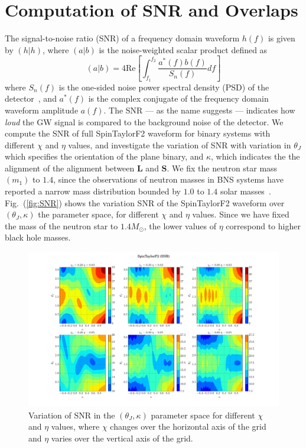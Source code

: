 \section{Computation of SNR and Overlaps}
The signal-to-noise ratio (SNR) of a frequency domain waveform $h(f)$ is given by 
$(h|h)$, where $(a|b)$ is the noise-weighted scalar product defined as 
\label{inner_product}  
\begin{equation} (a|b) = 4 \text{Re} \left[
\int_{f_{1}}^{f_{2}}  \dfrac{a^{*}(f)b(f)}{S_{n}(f)} df\right] 
\end{equation}
where $S_{n}(f)$ is the one-sided noise power spectral density (PSD) of the
detector~\cite{PSD}, and $a^{*}(f)$ is the complex conjugate of the frequency
domain waveform amplitude $a(f)$. The SNR --- as the name suggests --- indicates
how \textit{loud} the GW signal is compared to the background noise of the
detector. We compute the SNR of full SpinTaylorF2 waveform for binary systems
with  different $\chi$ and $\eta$ values, and investigate the variation of SNR
with variation in $\theta_{J}$ which specifies the orientation of the plane
binary, and $\kappa$, which indicates the the alignment of the alignment between
$\mathbf{L}$ and $\mathbf{S}$. We fix the neutron star mass $(m_{1})$ to $1.4$,
since the observations of neutron masses in BNS systems have reported a narrow
mass distribution bounded by $1.0$ to $1.4$ solar masses~\cite{Lorimer}.
Fig.~(\ref{fig:SNR}) shows the variation SNR of the SpinTaylorF2 waveform   over
$(\theta_J, \kappa)$ the parameter space, for different $\chi$ and $\eta$
values. Since we have fixed the mass of the neutron star to $1.4 M_{\odot}$, the
lower values of $\eta$ correspond to higher black hole masses.

\label{fig:SNR} 
\begin{figure}[t]
\includegraphics[width=\textwidth]{./images/SNR_GRID_0F.pdf}
\caption{Variation of SNR in the $(\theta_J, \kappa)$ parameter space for 
different $\chi$ and $\eta$ values, where $\chi$ changes over the horizontal 
axis of the grid and $\eta$ varies over the vertical axis of the grid.}
\centering 
\end{figure}

